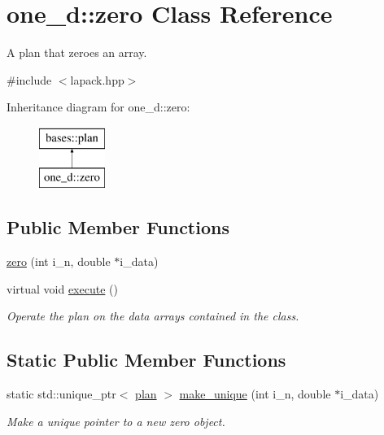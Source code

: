 \hypertarget{classone__d_1_1zero}{\section{one\-\_\-d\-:\-:zero Class Reference}
\label{classone__d_1_1zero}
}


A plan that zeroes an array.  




{\ttfamily \#include $<$lapack.\-hpp$>$}

Inheritance diagram for one\-\_\-d\-:\-:zero\-:\begin{figure}[H]
\begin{center}
\leavevmode
\includegraphics[height=2.000000cm]{classone__d_1_1zero}
\end{center}
\end{figure}
\subsection*{Public Member Functions}
\begin{DoxyCompactItemize}
\item 
\hyperlink{classone__d_1_1zero_a7a7d3c36309cc6328f66f55f127e3b35}{zero} (int i\-\_\-n, double $\ast$i\-\_\-data)
\item 
virtual void \hyperlink{classone__d_1_1zero_a3f6351613de3565e240d90ff6b95e8c4}{execute} ()
\begin{DoxyCompactList}\small\item\em Operate the plan on the data arrays contained in the class. \end{DoxyCompactList}\end{DoxyCompactItemize}
\subsection*{Static Public Member Functions}
\begin{DoxyCompactItemize}
\item 
static std\-::unique\-\_\-ptr$<$ \hyperlink{classbases_1_1plan_a7b4ddc2f876b9e4dcf899feb20ae369f}{plan} $>$ \hyperlink{classone__d_1_1zero_ad2ad2b1f59b9161d37d1178e2ad94cd5}{make\-\_\-unique} (int i\-\_\-n, double $\ast$i\-\_\-data)
\begin{DoxyCompactList}\small\item\em Make a unique pointer to a new zero object. \end{DoxyCompactList}\end{DoxyCompactItemize}
